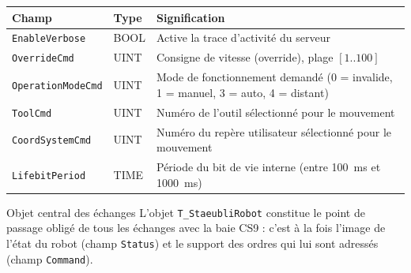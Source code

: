\begin{center}
\begin{tabular}{|l|l|p{6.5cm}|}
\hline
\textbf{Champ} & \textbf{Type} & \textbf{Signification} \\
\hline
\texttt{EnableVerbose} & BOOL & Active la trace d'activité du serveur \\
\hline
\texttt{OverrideCmd} & UINT & Consigne de vitesse (override), plage
$[1..100]$ \\
\hline
\texttt{OperationModeCmd} & UINT & Mode de fonctionnement demandé (0 =
invalide, 1 = manuel, 3 = auto, 4 = distant) \\
\hline
\texttt{ToolCmd} & UINT & Numéro de l'outil sélectionné pour le mouvement \\
\hline
\texttt{CoordSystemCmd} & UINT & Numéro du repère utilisateur sélectionné
pour le mouvement \\
\hline
\texttt{LifebitPeriod} & TIME & Période du bit de vie interne (entre
100~ms et 1000~ms) \\
\hline
\end{tabular}
\end{center}

\begin{UPSTIinfor}{Objet central des échanges}
L'objet \texttt{T\_StaeubliRobot} constitue le point de passage obligé de
tous les échanges avec la baie CS9 : c'est à la fois l'image de l'état du
robot (champ \texttt{Status}) et le support des ordres qui lui sont
adressés (champ \texttt{Command}).
\end{UPSTIinfor}
